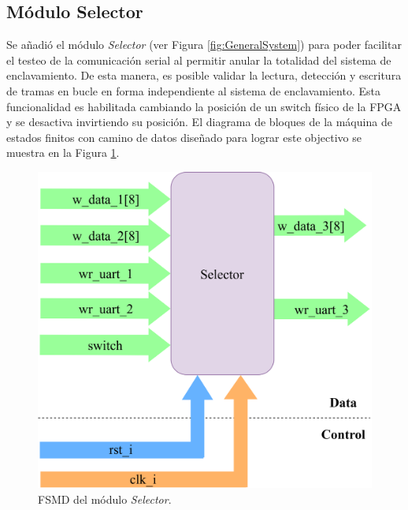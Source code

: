\subsection{Módulo Selector}
	\label{sec:selector}
	
	Se añadió el módulo \textit{Selector} (ver Figura \ref{fig:GeneralSystem}) para poder facilitar el testeo de la comunicación serial al permitir anular la totalidad del sistema de enclavamiento. De esta manera, es posible validar la lectura, detección y escritura de tramas en bucle en forma independiente al sistema de enclavamiento. Esta funcionalidad es habilitada cambiando la posición de un switch físico de la FPGA y se desactiva invirtiendo su posición. El diagrama de bloques de la máquina de estados finitos con camino de datos diseñado para lograr este objectivo se muestra en la Figura \ref{fig:Selector_module}.
	
	\begin{figure}[H]
		\centering
		\includegraphics[width=1\textwidth]{Figuras/Selector_module.png}
		\centering\caption{FSMD del módulo \textit{Selector}.}
		\label{fig:Selector_module}
	\end{figure}